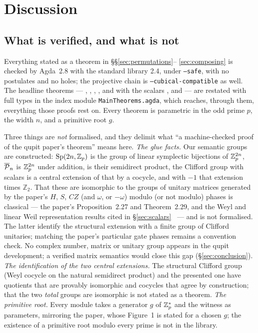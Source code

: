 \section{Discussion}\label{sec:discussion}

\subsection{What is verified, and what is not}

Everything stated as a theorem in \S\S\ref{sec:permutations}--%
\ref{sec:composing} is checked by Agda~2.8 with the standard library
2.4, under \texttt{--safe}, with no postulates and no holes; the
projective chain is \texttt{--cubical-compatible} as well.  The
headline theorems --- , ,
, , and with the scalars
,  and
 --- are restated with full types in the index
module \texttt{MainTheorems.agda}, which reaches, through them,
everything those proofs rest on.
Every theorem is parametric in the odd prime $p$, the width $n$, and a
primitive root $g$.

Three things are \emph{not} formalised, and they delimit what ``a
machine-checked proof of the qupit paper's theorem'' means here.
\emph{The glue facts.}  Our semantic groups are constructed: $\mathrm{Sp}(2n,\mathbb{Z}_p)$ is
the group of linear symplectic bijections of $\mathbb{Z}_p^{2n}$, $\overline{\mathcal{P}}_{n}$ is
$\mathbb{Z}_p^{2n}$ under addition,  is their semidirect product,
the Clifford group with scalars is a central extension of that by a
cocycle, and with $-1$ that extension times $\mathbb Z_2$.  That these
are isomorphic to the groups of unitary matrices generated by the
paper's $H$, $S$, $CZ$ (and $\omega$, or $-\omega$) modulo (or not
modulo) phases is
classical --- the paper's Proposition~2.27 and Theorem~2.29, and the
Weyl and linear Weil representation results cited in
\S\ref{sec:scalars}~\cite{gross2006hudson,gurevich2007geometric} ---
and is not formalised.  The latter identify the structural extension
with a finite group of Clifford unitaries; matching the paper's
particular gate phases remains a convention check.  No complex number, matrix or unitary
group appears in the qupit development; a verified matrix semantics
would close this gap (\S\ref{sec:conclusion}).  \emph{The
identification of the two central extensions.}  The structural Clifford
group (Weyl cocycle on the natural semidirect product) and the presented
one have quotients that are provably isomorphic and cocycles that agree
by construction; that the two \emph{total} groups are isomorphic is not
stated as a theorem.  \emph{The primitive root.}  Every module takes a
generator $g$ of $\mathbb{Z}_p^{*}$ and the witness  as parameters,
mirroring the paper, whose Figure~1 is stated for a chosen $g$; the
existence of a primitive root modulo every prime is not in the library.

